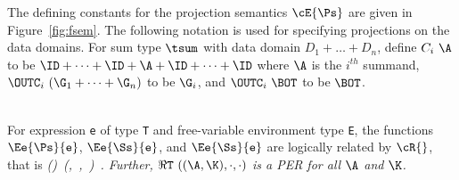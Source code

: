 \documentclass[11pt]{article}
\begin{document}

The defining constants for the projection semantics $\cE{\Ps}$ are
given in Figure~\ref{fig:fsem}. The following notation is used for
specifying projections on the data domains.  For sum type $\tsum$ with
data domain $D_1\plus\ldots\plus D_n$, define $C_i~\A$ to be
$\ID+\cdots+\ID+\A+\ID+\cdots+\ID$ where $\A$ is the $i^{th}$ summand,
$\OUTC_i~(\G_1+\cdots+\G_n)$ to be $\G_i$, and $\OUTC_i~\BOT$ to be
$\BOT$.

\ \\  For expression \mbox{\tt e} of type
\mbox{\tt T} and free-variable environment type \mbox{\tt E}, the functions
$\Ee{\Ps}{\mbox{\tt e}}$, $\Ee{\Ss}{\mbox{\tt e}}$, and $\Ee{\Ss}{\mbox{\tt e}}$ are logically
related by $\cR{}$, that is
\beqs
\it (\fto{})\ (,\ ,\ )\ .
\eeqs
Further, $\Re{}{\mbox{\tt T}}~((\A,\K),\cdot,\cdot)$ is a PER for all $\A$ and
$\K$.\ \ %
\end{document}
